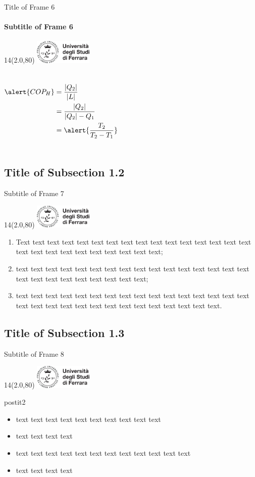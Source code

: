 \documentclass[11pt,xcolor={dvipsnames},default]{beamer} %
\DeclarePairedDelimiter{\abs}{\lvert}{\rvert}
\newcommand{\MyLogo}{%
\begin{textblock}{14}(2.0,80)
 \includegraphics[height=1.15cm, angle=0]{logo}
\end{textblock}
}
\begin{document}
\begin{frame}{Title of Frame 6}
\framesubtitle{Subtitle of Frame 6}
\MyLogo
\begin{columns}
\begin{align*}
 \alert{COP_H} &= \dfrac{\abs{Q_2}}{\abs{L}} \\
 	   &= \dfrac{\abs{Q_2}}{\abs{Q_2}-Q_1} \\
 	   &= \alert{\dfrac{T_2}{T_2-T_1}} \\
\end{align*}
\end{columns}
\end{frame}

\subsection{Title of Subsection 1.2}
\begin{frame}{Subtitle of Frame 7}
\MyLogo
\begin{enumerate}
\item<1-> Text text text text text text text text text text text text text text text text text text text text text text text text text text;
\item<2-> text text text text text text text text text text text text text text text text text text text text text text text text text;
\item<3-> text text text text text text text text text text text text text text text text text text text text text text text text text text text text text text.
\end{enumerate}
\end{frame}

\subsection{Title of Subsection 1.3}
\begin{frame}{Subtitle of Frame 8}
\MyLogo
\begin{center}
\end{center}
\pause
\begin{beamercolorbox}[shadow=false, rounded=true]{postit2}
\begin{itemize}
\item text text text text text text text text text text
\item text text text text
\item text text text text text text text text text text text text
\item text text text text
\end{itemize}
\end{beamercolorbox}
\end{frame}
\end{document}
